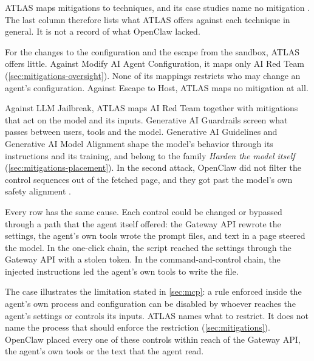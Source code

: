 ATLAS maps mitigations to techniques, and its case studies name no mitigation
\citep{mitre-atlas-2026}. The last column therefore lists what ATLAS offers against each technique
in general. It is not a record of what OpenClaw lacked.

For the changes to the configuration and the escape from the sandbox, ATLAS offers little. Against
Modify AI Agent Configuration, it maps only AI Red Team (\cref{sec:mitigations-oversight}). None of
its mappings restricts who may change an agent's configuration. Against Escape to Host, ATLAS maps
no mitigation at all.

Against LLM Jailbreak, ATLAS maps AI Red Team together with mitigations that act on the model and its
inputs. Generative AI Guardrails screen what passes between users, tools and the model. Generative
AI Guidelines and Generative AI Model Alignment shape the model's behavior through its instructions
and its training, and belong to the family \emph{Harden the model itself}
(\cref{sec:mitigations-placement}).
In the second attack, OpenClaw did not filter the control sequences out of the fetched page, and they
got past the model's own safety alignment \citep{mccauley2026openclaw,atlas-cs0051-openclaw-c2}.

Every row has the same cause. Each control could be changed or bypassed through a path that the
agent itself offered: the Gateway API rewrote the settings, the agent's own tools wrote the prompt
files, and text in a page steered the model. In the one-click chain, the script reached the settings
through the Gateway API with a stolen token. In the command-and-control chain, the injected
instructions led the agent's own tools to write the file.

The case illustrates the limitation stated in \cref{sec:mcp}: a rule enforced inside the agent's own
process and configuration can be disabled by whoever reaches the agent's settings or controls its
inputs. ATLAS names what to restrict. It does not name the process that should enforce the
restriction (\cref{sec:mitigations}). OpenClaw placed every one of these controls within reach of the
Gateway API, the agent's own tools or the text that the agent read.

